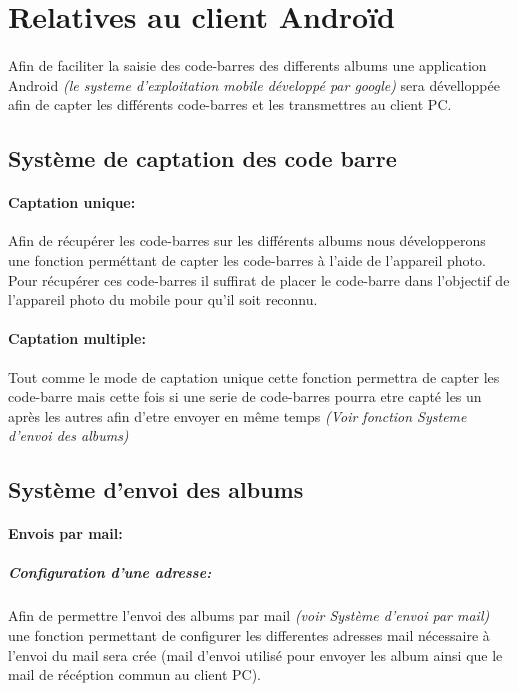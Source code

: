 \section{Relatives au client Androïd} 


\paragraph{}
Afin de faciliter la saisie des code-barres des differents albums une application Android \textit{(le systeme d'exploitation mobile développé par google)} sera dévelloppée afin de capter les différents code-barres et les transmettres au client PC.

\subsection{Système de captation des code barre}
\paragraph{Captation unique:}
Afin de récupérer les code-barres sur les différents albums nous développerons une fonction perméttant de capter les code-barres à l'aide de l'appareil photo.
Pour récupérer ces code-barres il suffirat de placer le code-barre dans l'objectif de l'appareil photo du mobile pour qu'il soit reconnu.

\paragraph{Captation multiple:}
Tout comme le mode de captation unique cette fonction permettra de capter les code-barre mais cette fois si une serie de code-barres pourra etre capté les un après les autres afin d'etre envoyer en même temps \textit{(Voir fonction Systeme d'envoi des albums)}

\subsection{Système d'envoi des albums}
\paragraph{Envois par mail:}
\subparagraph{Configuration d'une adresse:}
Afin de permettre l'envoi des albums par mail \textit{(voir Système d'envoi par mail)} une fonction permettant de configurer les differentes adresses mail nécessaire à l'envoi du mail sera crée (mail d'envoi utilisé pour envoyer les album ainsi que le mail de récéption commun au client PC).

